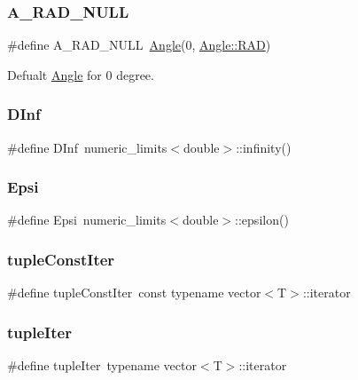 \subsubsection{\texorpdfstring{A\_RAD\_NULL}{A\_RAD\_NULL}}
{\footnotesize\ttfamily \#define A\+\_\+\+R\+A\+D\+\_\+\+N\+U\+LL~\mbox{\hyperlink{class_angle}{Angle}}(0, \mbox{\hyperlink{class_angle_a4f7b9849ce8780bcba95ca3ee45cff77a93ab6b68075fd7a6fe724fbde5b13c1f}{Angle\+::\+R\+AD}})}



Defualt \mbox{\hyperlink{class_angle}{Angle}} for 0 degree. 

\mbox{\label{maths_8hh_a995779faef78614d4f074b7d444de767}} 
\subsubsection{\texorpdfstring{DInf}{DInf}}
{\footnotesize\ttfamily \#define D\+Inf~numeric\+\_\+limits$<$double$>$\+::infinity()}

\mbox{\label{maths_8hh_a78802b279ab85021d7f6bffe51621703}} 
\subsubsection{\texorpdfstring{Epsi}{Epsi}}
{\footnotesize\ttfamily \#define Epsi~numeric\+\_\+limits$<$double$>$\+::epsilon()}

\mbox{\label{maths_8hh_a2eba794860251c1b30e532df32ee4d1b}} 
\subsubsection{\texorpdfstring{tupleConstIter}{tupleConstIter}}
{\footnotesize\ttfamily \#define tuple\+Const\+Iter~const typename vector$<$T$>$\+::iterator}

\mbox{\label{maths_8hh_ad22dcdeefda7d41523cc1604953eb6cc}} 
\subsubsection{\texorpdfstring{tupleIter}{tupleIter}}
{\footnotesize\ttfamily \#define tuple\+Iter~typename vector$<$T$>$\+::iterator}




